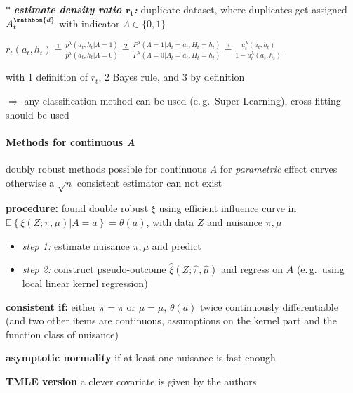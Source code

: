 \documentclass[8pt,twoside]{extarticle}
\begin{document}
\begin{multicols}{2}
 


 $\boldsymbol{*}$ \textit{\textbf{estimate density ratio $\boldsymbol{r_t}$:}} duplicate dataset, where duplicates get assigned $A_t^{\mathbbm{d}}$ with indicator $\Lambda\in\{0,1\}$

 $r_t(a_t,h_t) \! \overset{1}{=} \!\frac{p^\lambda(a_t,h_t|\Lambda =1)}{p^\lambda(a_t,h_t|\Lambda =0)} 
\overset{2}{=} \frac{P^\lambda(\Lambda=1|A_t=a_t, H_t=h_t)}{P^\lambda(\Lambda=0|A_t=a_t, H_t=h_t)}
\overset{3}{=} \frac{u_t^\lambda(a_t,h_t)}{1{-}u_t^\lambda(a_t,h_t)}
$

 with 1 definition of $r_t$, 2 Bayes rule, and 3 by definition

 $\Rightarrow$ any classification method can be used (e.\,g.\ Super Learning), cross-fitting should be used


\paragraph{Methods for continuous \textit{A}} \citep{kennedy2017non}

 doubly robust methods possible for continuous $A$ for \textit{parametric} effect curves otherwise a $\sqrt{n}$ consistent estimator can not exist

 \textbf{procedure:} found double robust $\xi$ using efficient influence curve in 
$\mathbb{E}\left\{\xi(Z;\bar{\pi},\bar{\mu})|A=a\right\}=\theta(a)$, with data $Z$ and nuisance $\pi,\mu$

\begin{itemize}[leftmargin=*, itemsep=0em, topsep=0pt, partopsep=0pt,parsep=0pt]
\item[] \textit{step 1:} estimate nuisance $\pi,\mu$ and predict
\item[] \textit{step 2:} construct pseudo-outcome $\hat{\xi}(Z;\hat{\pi}, \hat{\mu})$ and regress on $A$ (e.\,g.\ using local linear kernel regression)
\end{itemize}

 \textbf{consistent if:} either $\bar{\pi}=\pi$ or $\bar{\mu}=\mu$, $\theta(a)$ twice continuously differentiable (and two other items are continuous, assumptions on the kernel part and the function class of nuisance) 

 \textbf{asymptotic normality} if at least one nuisance is  fast enough

 \textbf{TMLE version} a clever covariate is given by the authors






\end{multicols}






\def\bibpreamble{\textit{If no citation is given, the information is taken from  the book \citep{hernan2020causal}} \vspace{1.5em}}

 
 
\end{document}
